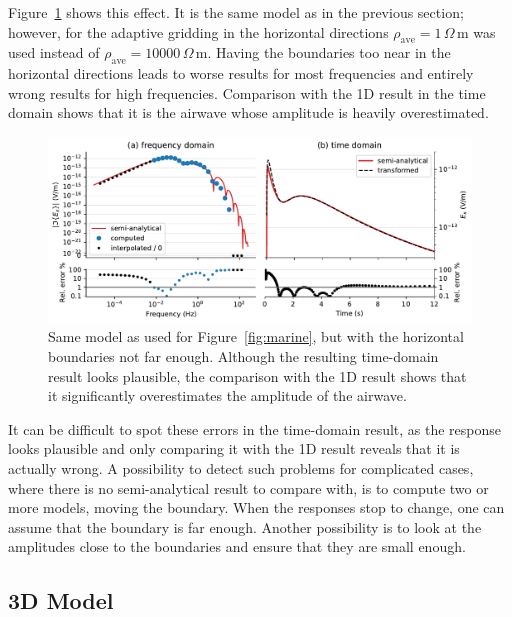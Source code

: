 \documentclass[extra, camera,%
    referee,     %
]{gji}
\newlength{\fwidth}
\newcommand{\mr}[1]{\mathrm{#1}}
\newcommand{\ohmm}{\ensuremath{\Omega\,}\text{m}\xspace}
\begin{document}
Figure~\ref{fig:marine-wrong-x-y} shows this effect. It is the same model as in
the previous section; however, for the adaptive gridding in the horizontal
directions $\rho_\mr{ave}=1\,\ohmm$ was used instead of
$\rho_\mr{ave}=\num{10000}\,\ohmm$. Having the boundaries too near in the
horizontal directions leads to worse results for most frequencies and entirely
wrong results for high frequencies. Comparison with the 1D result in the time
domain shows that it is the airwave whose amplitude is heavily overestimated.
%
\begin{figure}
  \centering
  \includegraphics[width=\fwidth]{08-marine-wrong-x-y}
  \caption{Same model as used for Figure~\ref{fig:marine}, but with the
    horizontal boundaries not far enough. Although the resulting time-domain
    result looks plausible, the comparison with the 1D result shows that it
    significantly overestimates the amplitude of the airwave.}
  \label{fig:marine-wrong-x-y}
\end{figure}
%
It can be difficult to spot these errors in the time-domain result, as the
response looks plausible and only comparing it with the 1D result reveals that
it is actually wrong. A possibility to detect such problems for complicated
cases, where there is no semi-analytical result to compare with, is to compute
two or more models, moving the boundary. When the responses stop to change, one
can assume that the boundary is far enough. Another possibility is to look at
the amplitudes close to the boundaries and ensure that they are small enough.


\subsection{3D Model} %
\end{document}
